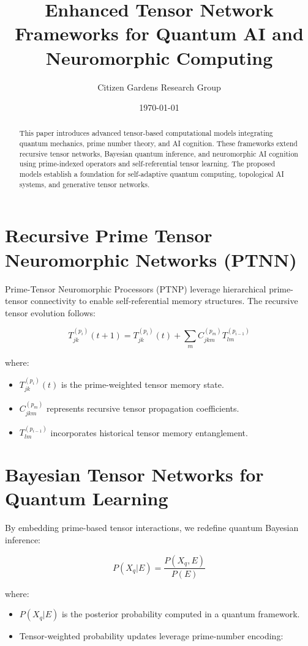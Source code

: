 \documentclass{article}
\title{Enhanced Tensor Network Frameworks for Quantum AI and Neuromorphic Computing}
\author{Citizen Gardens Research Group}
\date{\today}
\theoremstyle{plain}
\begin{document}
\maketitle

\begin{abstract}
This paper introduces advanced tensor-based computational models integrating quantum mechanics, prime number theory, and AI cognition. These frameworks extend recursive tensor networks, Bayesian quantum inference, and neuromorphic AI cognition using prime-indexed operators and self-referential tensor learning. The proposed models establish a foundation for self-adaptive quantum computing, topological AI systems, and generative tensor networks.
\end{abstract}

\section{Recursive Prime Tensor Neuromorphic Networks (PTNN)}
Prime-Tensor Neuromorphic Processors (PTNP) leverage hierarchical prime-tensor connectivity to enable self-referential memory structures. The recursive tensor evolution follows:

\begin{equation}
T_{jk}^{(p_i)}(t+1) = T_{jk}^{(p_i)}(t) + \sum_{m} C_{jkm}^{(p_m)} T_{lm}^{(p_{i-1})}
\end{equation}

where:
\begin{itemize}
    \item \(T_{jk}^{(p_i)}(t)\) is the prime-weighted tensor memory state.
    \item \(C_{jkm}^{(p_m)}\) represents recursive tensor propagation coefficients.
    \item \(T_{lm}^{(p_{i-1})}\) incorporates historical tensor memory entanglement.
\end{itemize}
\section{Bayesian Tensor Networks for Quantum Learning}
By embedding prime-based tensor interactions, we redefine quantum Bayesian inference:

\begin{equation}
P(X_q | E) = \frac{P(X_q, E)}{P(E)}
\end{equation}

where:
\begin{itemize}
    \item \( P(X_q | E) \) is the posterior probability computed in a quantum framework.
    \item Tensor-weighted probability updates leverage prime-number encoding:
\end{itemize}
\end{document}
